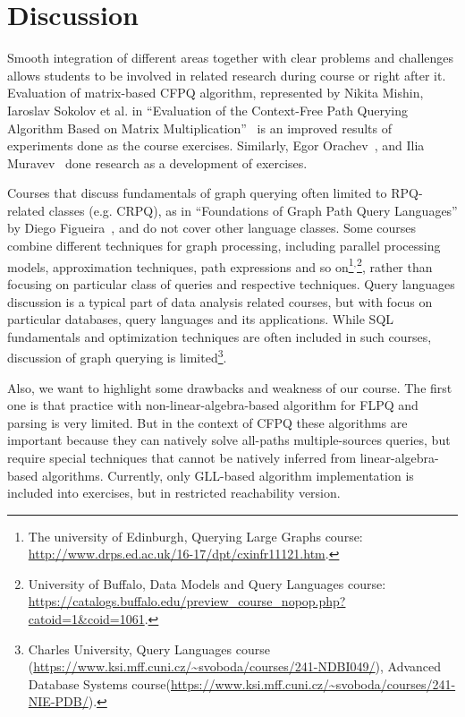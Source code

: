 \documentclass[sigconf]{acmart}
\begin{document}
\section{Discussion}

Smooth integration of different areas together with clear problems and challenges allows students to be involved in related research during course or right after it. 
Evaluation of matrix-based CFPQ algorithm, represented by Nikita Mishin, Iaroslav Sokolov et al. in ``Evaluation of the Context-Free Path Querying Algorithm Based on Matrix Multiplication''~\cite{10.1145/3327964.3328503} is an improved results of experiments done as the course exercises. 
Similarly, Egor Orachev~\cite{10.1007/978-3-030-54832-2_6}, and Ilia Muravev~\cite{muravev2024optimizationcontextfreelanguagereachability} done research as a development of exercises.

Courses that discuss fundamentals of graph querying often limited to RPQ-related classes (e.g. CRPQ), as in ``Foundations of Graph Path Query Languages'' by Diego Figueira~\cite{Figueira2022}, and do not cover other language classes. 
Some courses combine different techniques for graph processing, including parallel processing models, approximation techniques, path expressions and so on\footnote{The university of Edinburgh, Querying Large Graphs course: \url{http://www.drps.ed.ac.uk/16-17/dpt/cxinfr11121.htm}.}$^{,}$\footnote{University of Buffalo, Data Models and Query Languages course: \url{https://catalogs.buffalo.edu/preview_course_nopop.php?catoid=1&coid=1061}.}, rather than focusing on particular class of queries and respective techniques.
Query languages discussion is a typical part of data analysis related courses, but with focus on particular databases, query languages and its applications.
While SQL fundamentals and optimization techniques are often included in such courses, discussion of graph querying is limited\footnote{Charles University, Query Languages course (\url{https://www.ksi.mff.cuni.cz/~svoboda/courses/241-NDBI049/}), Advanced Database Systems course(\url{https://www.ksi.mff.cuni.cz/~svoboda/courses/241-NIE-PDB/}).}.


Also, we want to highlight some drawbacks and weakness of our course.
The first one is that practice with non-linear-algebra-based algorithm for FLPQ and parsing is very limited. 
But in the context of CFPQ these algorithms are important because they can natively solve all-paths multiple-sources queries, but require special techniques that cannot be natively inferred from linear-algebra-based algorithms.
Currently, only GLL-based algorithm implementation is included into exercises, but in restricted reachability version.
\end{document}
